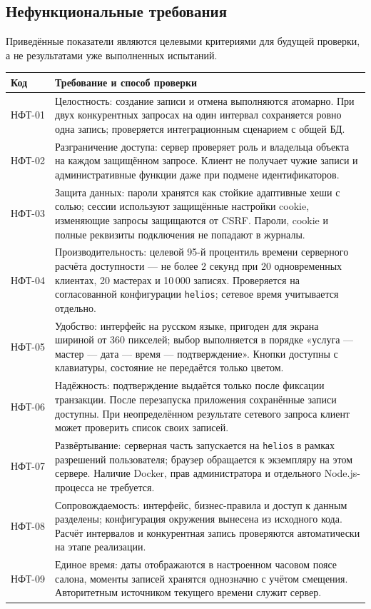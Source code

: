 \subsection{Нефункциональные требования}
Приведённые показатели являются целевыми критериями для будущей проверки, а не результатами уже выполненных испытаний.
\begin{longtable}{L{1.6cm}L{13.2cm}}
\toprule Код & Требование и способ проверки \\ \midrule
\endhead
НФТ-01 & Целостность: создание записи и отмена выполняются атомарно. При двух конкурентных запросах на один интервал сохраняется ровно одна запись; проверяется интеграционным сценарием с общей БД. \\
НФТ-02 & Разграничение доступа: сервер проверяет роль и владельца объекта на каждом защищённом запросе. Клиент не получает чужие записи и административные функции даже при подмене идентификаторов. \\
НФТ-03 & Защита данных: пароли хранятся как стойкие адаптивные хеши с солью; сессии используют защищённые настройки cookie, изменяющие запросы защищаются от CSRF. Пароли, cookie и полные реквизиты подключения не попадают в журналы. \\
НФТ-04 & Производительность: целевой 95-й процентиль времени серверного расчёта доступности --- не более 2 секунд при 20 одновременных клиентах, 20 мастерах и 10\,000 записях. Проверяется на согласованной конфигурации \texttt{helios}; сетевое время учитывается отдельно. \\
НФТ-05 & Удобство: интерфейс на русском языке, пригоден для экрана шириной от 360 пикселей; выбор выполняется в порядке «услуга --- мастер --- дата --- время --- подтверждение». Кнопки доступны с клавиатуры, состояние не передаётся только цветом. \\
НФТ-06 & Надёжность: подтверждение выдаётся только после фиксации транзакции. После перезапуска приложения сохранённые записи доступны. При неопределённом результате сетевого запроса клиент может проверить список своих записей. \\
НФТ-07 & Развёртывание: серверная часть запускается на \texttt{helios} в рамках разрешений пользователя; браузер обращается к экземпляру на этом сервере. Наличие Docker, прав администратора и отдельного Node.js-процесса не требуется. \\
НФТ-08 & Сопровождаемость: интерфейс, бизнес-правила и доступ к данным разделены; конфигурация окружения вынесена из исходного кода. Расчёт интервалов и конкурентная запись проверяются автоматически на этапе реализации. \\
НФТ-09 & Единое время: даты отображаются в настроенном часовом поясе салона, моменты записей хранятся однозначно с учётом смещения. Авторитетным источником текущего времени служит сервер. \\
\bottomrule
\end{longtable}

